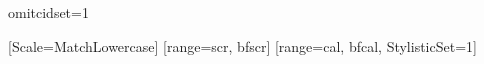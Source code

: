 
\usepackage{fontspec}
\usepackage{luatexbase}


\usepackage{amsmath}
\usepackage{amssymb}
\usepackage{mathtools}

\usepackage[
  mathrm=sym,        %
  math-style=ISO,    
  bold-style=ISO,   
  sans-style=italic,
  nabla=upright,
  partial=upright,
]{unicode-math}

\usepackage[
  locale=US,
  separate-uncertainty=true,
  per-mode=reciprocal,
]{siunitx}




\pdfvariable omitcidset=1

\setsansfont{Libertinus Sans}
\setmonofont{Fira Mono}[Scale=MatchLowercase]
[range={scr, bfscr}]
[range={cal, bfcal}, StylisticSet=1]
